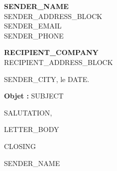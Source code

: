 \documentclass[11pt,a4paper]{article}
\begin{document}
\pagestyle{empty}

\begin{minipage}[t]{0.55\textwidth}
  \textbf{{{SENDER_NAME}}}\\
  {{SENDER_ADDRESS_BLOCK}}\\
  {{SENDER_EMAIL}}\\
  {{SENDER_PHONE}}
\end{minipage}%
\hfill
\begin{minipage}[t]{0.40\textwidth}
\raggedleft
  \textbf{{{RECIPIENT_COMPANY}}}\\
  {{RECIPIENT_ADDRESS_BLOCK}}
\end{minipage}

\vspace{2em}

\hfill {{SENDER_CITY}}, le {{DATE}}.

\vspace{1.5em}

\textbf{Objet :} {{SUBJECT}}

\vspace{1.5em}

{{SALUTATION}},

\vspace{0.4em}

{{LETTER_BODY}}

\vspace{0.6em}

{{CLOSING}}

\vspace{2em}

\hfill {{SENDER_NAME}}
\end{document}
